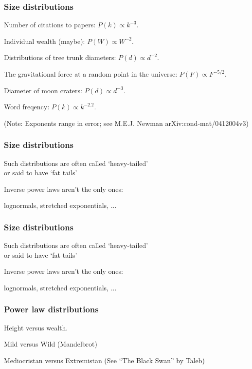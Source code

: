 \begin{frame}
  \frametitle{Size distributions}

{

Number of citations to papers: $P(k) \propto k^{-3}$.

Individual wealth (maybe): $P(W) \propto W^{-2}$.

Distributions of tree trunk diameters: $P(d) \propto d^{-2}$.

The gravitational force at a random point in the universe: $P(F) \propto F^{-5/2}$.

Diameter of moon craters: $P(d) \propto d^{-3}$.

Word freqency: $P(k) \propto k^{-2.2}$.

}
{\tiny
(Note: Exponents range in error; see M.E.J. Newman arXiv:cond-mat/0412004v3)
}



\end{frame}

\begin{frame}
  \frametitle{Size distributions}

Such distributions are often called `heavy-tailed'\\
or said to have `fat tails'

\inv

Inverse power laws aren't the only ones:

lognormals, stretched exponentials, ...

\end{frame}

\begin{frame}
  \frametitle{Size distributions}

Such distributions are often called `heavy-tailed'\\
or said to have `fat tails'


Inverse power laws aren't the only ones:

lognormals, stretched exponentials, ...

\end{frame}

\begin{frame}
  \frametitle{Power law distributions}


\inv

Height versus wealth.

Mild versus Wild (Mandelbrot)

Mediocristan versus Extremistan {\small (See ``The Black Swan'' by Taleb)}


\end{frame}

